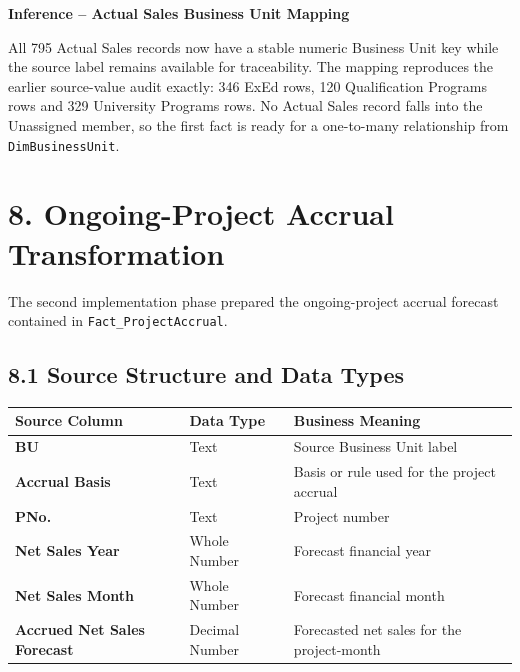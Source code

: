 \documentclass[11pt,a4paper]{article}
\begin{document}
\begin{inferencebox}

\textbf{Inference -- Actual Sales Business Unit Mapping}

All 795 Actual Sales records now have a stable numeric Business Unit key while
the source label remains available for traceability. The mapping reproduces the
earlier source-value audit exactly: 346 ExEd rows, 120 Qualification Programs
rows and 329 University Programs rows. No Actual Sales record falls into the
Unassigned member, so the first fact is ready for a one-to-many relationship
from \texttt{DimBusinessUnit}.

\end{inferencebox}


\section{8. Ongoing-Project Accrual Transformation}

The second implementation phase prepared the ongoing-project accrual
forecast contained in \texttt{Fact\_ProjectAccrual}.

\subsection{8.1 Source Structure and Data Types}

\begin{tabularx}{\textwidth}{
    >{\bfseries}p{5cm}
    p{3.5cm}
    X
}

\toprule

Source Column
&
Data Type
&
Business Meaning
\\

\midrule

BU
&
Text
&
Source Business Unit label
\\

Accrual Basis
&
Text
&
Basis or rule used for the project accrual
\\

PNo.
&
Text
&
Project number
\\

Net Sales Year
&
Whole Number
&
Forecast financial year
\\

Net Sales Month
&
Whole Number
&
Forecast financial month
\\

Accrued Net Sales Forecast
&
Decimal Number
&
Forecasted net sales for the project-month
\\

\bottomrule

\end{tabularx}
\end{document}
